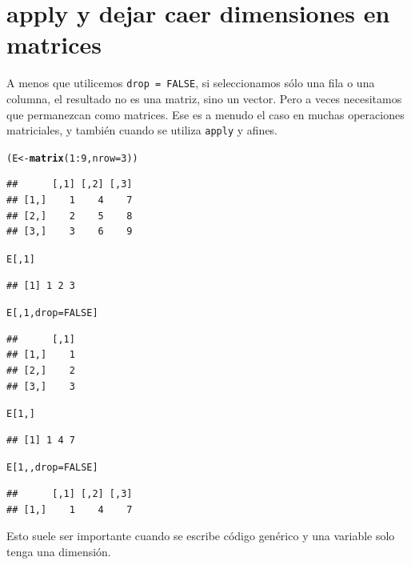 \documentclass{config/apuntes}\usepackage[]{graphicx}\usepackage[]{xcolor}
\makeatletter
\newcommand{\hlnum}[1]{\textcolor[rgb]{0.686,0.059,0.569}{#1}}%
\newcommand{\hlopt}[1]{\textcolor[rgb]{0,0,0}{#1}}%
\newcommand{\hldef}[1]{\textcolor[rgb]{0.345,0.345,0.345}{#1}}%
\newcommand{\hlkwb}[1]{\textcolor[rgb]{0.69,0.353,0.396}{#1}}%
\newcommand{\hlkwc}[1]{\textcolor[rgb]{0.333,0.667,0.333}{#1}}%
\newcommand{\hlkwd}[1]{\textcolor[rgb]{0.737,0.353,0.396}{\textbf{#1}}}%
\newenvironment{kframe}{%
 \def\at@end@of@kframe{}%
 \ifinner\ifhmode%
  \def\at@end@of@kframe{\end{minipage}}%
  \begin{minipage}{\columnwidth}%
 \fi\fi%
 \def\FrameCommand##1{\hskip\@totalleftmargin \hskip-\fboxsep
 \colorbox{shadecolor}{##1}\hskip-\fboxsep
     \hskip-\linewidth \hskip-\@totalleftmargin \hskip\columnwidth}%
 \MakeFramed {\advance\hsize-\width
   \@totalleftmargin\z@ \linewidth\hsize
   \@setminipage}}%
 {\par\unskip\endMakeFramed%
 \at@end@of@kframe}
\newenvironment{knitrout}{}{} %
\newcommand{\code}[1]{\texttt{#1}}
\makeatother
\begin{document}
\section{apply y dejar caer dimensiones en matrices}
A menos que utilicemos \code{drop = FALSE}, si seleccionamos sólo una fila o una columna, el resultado no es una matriz, sino un vector. Pero a veces necesitamos que permanezcan como matrices. Ese es a menudo el caso en muchas operaciones matriciales, y también cuando se utiliza \code{apply} y afines.
\begin{knitrout}
\color{fgcolor}\begin{kframe}
\begin{alltt}
\hldef{(E} \hlkwb{<-} \hlkwd{matrix}\hldef{(}\hlnum{1}\hlopt{:}\hlnum{9}\hldef{,} \hlkwc{nrow} \hldef{=} \hlnum{3}\hldef{))}
\end{alltt}
\begin{verbatim}
##      [,1] [,2] [,3]
## [1,]    1    4    7
## [2,]    2    5    8
## [3,]    3    6    9
\end{verbatim}
\begin{alltt}
\hldef{E[,} \hlnum{1}\hldef{]}
\end{alltt}
\begin{verbatim}
## [1] 1 2 3
\end{verbatim}
\begin{alltt}
\hldef{E[,} \hlnum{1}\hldef{,} \hlkwc{drop} \hldef{=} \hlnum{FALSE}\hldef{]}
\end{alltt}
\begin{verbatim}
##      [,1]
## [1,]    1
## [2,]    2
## [3,]    3
\end{verbatim}
\begin{alltt}
\hldef{E[}\hlnum{1}\hldef{, ]}
\end{alltt}
\begin{verbatim}
## [1] 1 4 7
\end{verbatim}
\begin{alltt}
\hldef{E[}\hlnum{1}\hldef{, ,} \hlkwc{drop} \hldef{=} \hlnum{FALSE}\hldef{]}
\end{alltt}
\begin{verbatim}
##      [,1] [,2] [,3]
## [1,]    1    4    7
\end{verbatim}
\end{kframe}
\end{knitrout}

Esto suele ser importante cuando se escribe código genérico y una variable solo tenga una dimensión.
\end{document}
